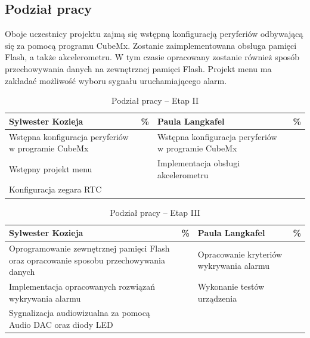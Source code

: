 \documentclass[10pt, a4paper]{article}
\begin{document}

\subsection{Podział pracy}
Oboje uczestnicy projektu zajmą się wstępną konfiguracją peryferiów odbywającą się za pomocą programu CubeMx. Zostanie zaimplementowana obsługa pamięci Flash, a także akcelerometru. W tym czasie opracowany zostanie również sposób przechowywania danych na zewnętrznej pamięci Flash. Projekt menu ma zakładać możliwość wyboru sygnału uruchamiającego alarm.

\begin{table}[H]
	\centering
	\begin{tabular}{|L{7cm}|L{0.8cm}||L{7cm}|L{0.8cm}|}
		\hline
		\hline
		\textbf{Sylwester Kozieja} & 
		\% & 
		\textbf{Paula Langkafel} & \%\\
		\hline
		\hline
		Wstępna konfiguracja peryferiów w programie CubeMx		& &	
		Wstępna konfiguracja peryferiów w programie CubeMx &\\
		\hline
		Wstępny projekt menu& &
		Implementacja obsługi akcelerometru &\\
		
		\hline Konfiguracja zegara RTC & & &\\
		\hline
	\end{tabular}
	\caption{Podział pracy -- Etap II}
	\label{tab:PodzialPracyEtap2}
\end{table}

\begin{table}[H]
	\centering
	\begin{tabular}{|L{7cm}|L{0.8cm}||L{7cm}|L{0.8cm}|}
		\hline
		\hline
		\textbf{Sylwester Kozieja} & 
		\% & 
		\textbf{Paula Langkafel} & \%\\
		\hline
		\hline
		Oprogramowanie zewnętrznej pamięci Flash oraz opracowanie sposobu przechowywania danych		& &	
		Opracowanie kryteriów wykrywania alarmu &\\
		\hline
		Implementacja opracowanych rozwiązań wykrywania alarmu  & &
		Wykonanie testów urządzenia &\\
		\hline
		Sygnalizacja audiowizualna za pomocą Audio DAC oraz diody LED & & &\\
		\hline
	\end{tabular}
	\caption{Podział pracy -- Etap III}
	\label{tab:PodzialPracyEtap3}
\end{table}
\end{document}

